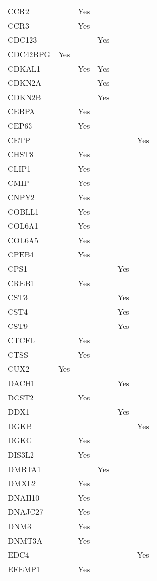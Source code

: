 \documentclass[]{report}
\begin{document}
\begin{longtable}[t]{llllll}
CCR2 &  & Yes &  &  & \\
CCR3 &  & Yes &  &  & \\
CDC123 &  &  & Yes &  & \\
CDC42BPG & Yes &  &  &  & \\
CDKAL1 &  & Yes & Yes &  & \\
CDKN2A &  &  & Yes &  & \\
CDKN2B &  &  & Yes &  & \\
CEBPA &  & Yes &  &  & \\
CEP63 &  & Yes &  &  & \\
CETP &  &  &  &  & Yes\\
CHST8 &  & Yes &  &  & \\
CLIP1 &  & Yes &  &  & \\
CMIP &  & Yes &  &  & \\
CNPY2 &  & Yes &  &  & \\
COBLL1 &  & Yes &  &  & \\
COL6A1 &  & Yes &  &  & \\
COL6A5 &  & Yes &  &  & \\
CPEB4 &  & Yes &  &  & \\
CPS1 &  &  &  & Yes & \\
CREB1 &  & Yes &  &  & \\
CST3 &  &  &  & Yes & \\
CST4 &  &  &  & Yes & \\
CST9 &  &  &  & Yes & \\
CTCFL &  & Yes &  &  & \\
CTSS &  & Yes &  &  & \\
CUX2 & Yes &  &  &  & \\
DACH1 &  &  &  & Yes & \\
DCST2 &  & Yes &  &  & \\
DDX1 &  &  &  & Yes & \\
DGKB &  &  &  &  & Yes\\
DGKG &  & Yes &  &  & \\
DIS3L2 &  & Yes &  &  & \\
DMRTA1 &  &  & Yes &  & \\
DMXL2 &  & Yes &  &  & \\
DNAH10 &  & Yes &  &  & \\
DNAJC27 &  & Yes &  &  & \\
DNM3 &  & Yes &  &  & \\
DNMT3A &  & Yes &  &  & \\
EDC4 &  &  &  &  & Yes\\
EFEMP1 &  & Yes &  &  & \\

\end{longtable}
\end{document}
